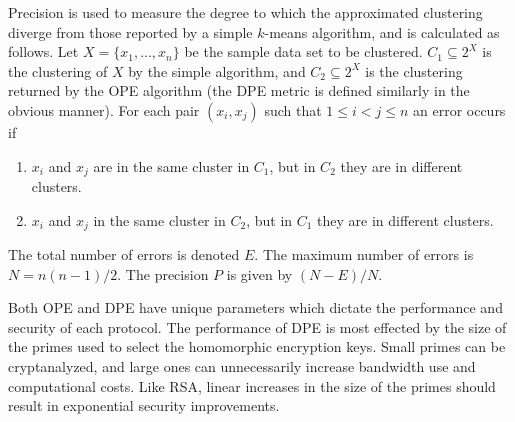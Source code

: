Precision is used to measure the degree to which the approximated
clustering diverge from those reported by a simple $k$-means
algorithm, and is calculated as follows.  Let $X = \{x_1, \dots,
x_n\}$ be the sample data set to be clustered.  $C_1 \subseteq 2^X$ is
the clustering of $X$ by the simple algorithm, and $C_2 \subseteq 2^X$
is the clustering returned by the OPE algorithm (the DPE metric is
defined similarly in the obvious manner).  For each pair $(x_i,x_j)$
such that $1 \leq i < j \leq n$ an error occurs if

\vspace{-4pt}

\itembase
\begin{enumerate}
\itembase
\item 
$x_i$ and $x_j$ are in the same cluster in $C_1$, but in $C_2$
they are in different clusters.

\item
$x_i$ and $x_j$ in the same cluster in $C_2$, but in $C_1$
they are in different clusters.
\end{enumerate}

\vspace{-4pt}

\noindent
The total number of errors is denoted $E$.  The maximum number of
errors is $N = n(n-1)/2$.  The precision $P$ is given by $(N-E)/N$.

Both OPE and DPE have unique parameters which dictate the performance
and security of each protocol.  The performance of DPE is most
effected by the size of the primes used to select the homomorphic
encryption keys.  Small primes can be cryptanalyzed, and large ones
can unnecessarily increase bandwidth use and computational costs.
Like RSA, linear increases in the size of the primes should result in
exponential security improvements.


